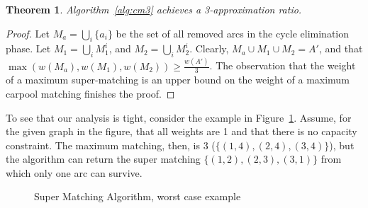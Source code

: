 \documentclass[draft]{article}
\newtheorem{theorem}{Theorem}
\begin{document}
\begin{theorem}
Algorithm~\ref{alg:cm3} achieves a 3-approximation ratio.
\end{theorem}

\begin{proof}
Let $M_a = \bigcup_i \{a_i\}$ be the set of all removed arcs in the cycle
elimination phase.
Let $M_1 = \bigcup_i M^i_1$, and $M_2 = \bigcup_i M^i_2$.
Clearly, $M_a \cup M_1 \cup M_2 = A'$, 
and that $\max(w(M_a), w(M_1), w(M_2)) \geq
\frac{w(A')}{3}$.
The observation that the weight of a maximum super-matching is an upper bound on
the weight of a maximum carpool matching finishes the proof. 
\end{proof}

To see that our analysis is tight, consider the example in
Figure~\ref{fig:3cm-tight-fig}. 
Assume, for the given graph in the figure, 
that all weights are 1 and that there is no capacity constraint.
The maximum matching, then, is 3 ($\{(1,4), (2,4), (3,4)\}$), 
but the algorithm can return the super matching $\{(1,2), (2,3), (3,1)\}$ from which
only one arc can survive.  

\begin{figure}
\centering
{}
\caption{
\label{fig:3cm-tight-fig}
Super Matching Algorithm, worst case example
}
\end{figure}



\end{document}

